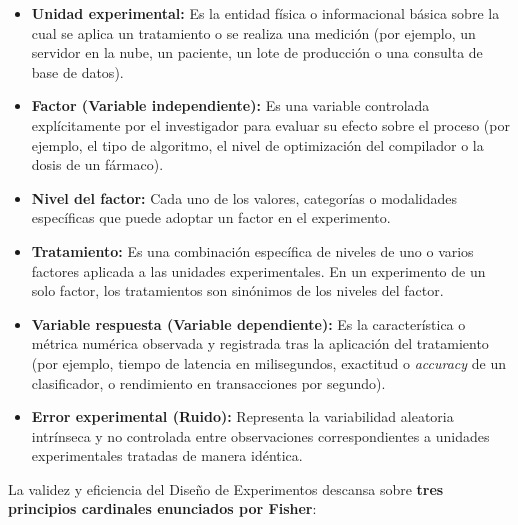 \begin{definicion}
	\begin{itemize}
		\item \textbf{Unidad experimental:} Es la entidad física o informacional básica sobre la cual se aplica un tratamiento o se realiza una medición (por ejemplo, un servidor en la nube, un paciente, un lote de producción o una consulta de base de datos).
		\item \textbf{Factor (Variable independiente):} Es una variable controlada explícitamente por el investigador para evaluar su efecto sobre el proceso (por ejemplo, el tipo de algoritmo, el nivel de optimización del compilador o la dosis de un fármaco).
		\item \textbf{Nivel del factor:} Cada uno de los valores, categorías o modalidades específicas que puede adoptar un factor en el experimento.
		\item \textbf{Tratamiento:} Es una combinación específica de niveles de uno o varios factores aplicada a las unidades experimentales. En un experimento de un solo factor, los tratamientos son sinónimos de los niveles del factor.
		\item \textbf{Variable respuesta (Variable dependiente):} Es la característica o métrica numérica observada y registrada tras la aplicación del tratamiento (por ejemplo, tiempo de latencia en milisegundos, exactitud o \emph{accuracy} de un clasificador, o rendimiento en transacciones por segundo).
		\item \textbf{Error experimental (Ruido):} Representa la variabilidad aleatoria intrínseca y no controlada entre observaciones correspondientes a unidades experimentales tratadas de manera idéntica.
	\end{itemize}
\end{definicion}

La validez y eficiencia del Diseño de Experimentos descansa sobre \textbf{tres principios cardinales enunciados por Fisher}:

